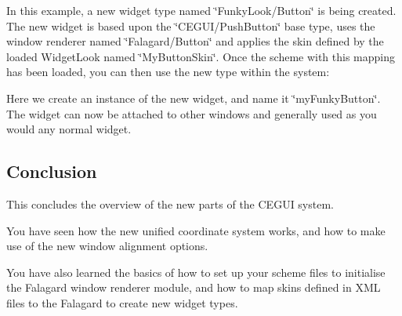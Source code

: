 In this example, a new widget type named \char`\"{}\+Funky\+Look/\+Button\char`\"{} is being created. The new widget is based upon the \char`\"{}\+C\+E\+G\+U\+I/\+Push\+Button\char`\"{} base type, uses the window renderer named \char`\"{}\+Falagard/\+Button\char`\"{} and applies the skin defined by the loaded Widget\+Look named \char`\"{}\+My\+Button\+Skin\char`\"{}. Once the scheme with this mapping has been loaded, you can then use the new type within the system\+: 
\begin{DoxyCode}{0}
\DoxyCodeLine{\textcolor{comment}{// Get access to the main window manager}}
\DoxyCodeLine{}
\DoxyCodeLine{\textcolor{comment}{// Create a new widget}}
\end{DoxyCode}


Here we create an instance of the new widget, and name it \char`\"{}my\+Funky\+Button\char`\"{}. The widget can now be attached to other windows and generally used as you would any \textquotesingle{}normal\textquotesingle{} widget.\hypertarget{fal_intro_fal_conclusion}{}\subsection{Conclusion}\label{fal_intro_fal_conclusion}
This concludes the overview of the new parts of the C\+E\+G\+UI system.

You have seen how the new unified coordinate system works, and how to make use of the new window alignment options.

You have also learned the basics of how to set up your scheme files to initialise the Falagard window renderer module, and how to map skins defined in X\+ML files to the Falagard to create new widget types.


